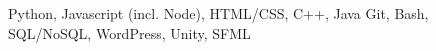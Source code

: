 
\begin{cventries}
\vspace*{-5mm}
\cventry
    {Python, Javascript (incl. Node), HTML/CSS, C++, Java\newline
    Git, Bash, SQL/NoSQL, WordPress, Unity, SFML}
    {}
    {}
    {}
    {}
\end{cventries}
